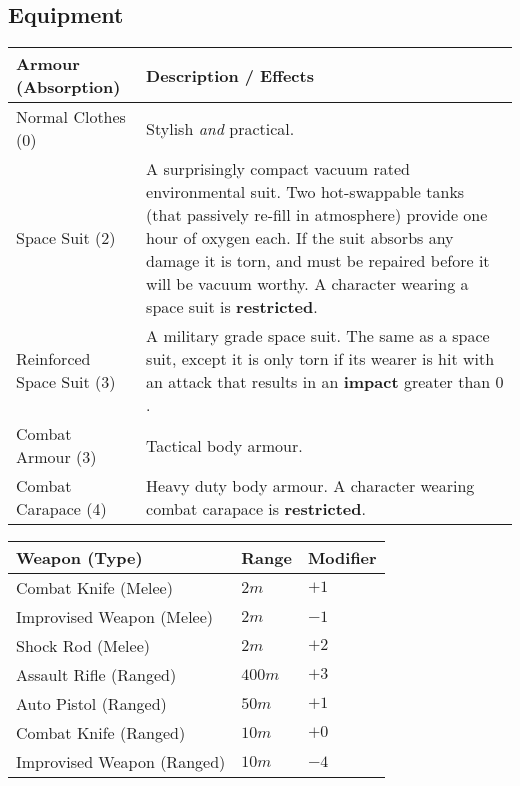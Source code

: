 \documentclass[11pt]{article}
\begin{document}
\begin{multicols}{3}
  \subsection*{Equipment}

  \begin{tabularx}{\linewidth}{lX}
    Armour (Absorption) & Description / Effects \\
    \hline
    Normal Clothes (0) & Stylish \textit{and} practical. \\
    Space Suit (2) & A surprisingly compact vacuum rated environmental suit. Two hot-swappable tanks (that passively re-fill in atmosphere) provide one hour of oxygen each. If the suit absorbs any damage it is torn, and must be repaired before it will be vacuum worthy. A character wearing a space suit is \textbf{restricted}. \\
    Reinforced Space Suit (3) & A military grade space suit. The same as a space suit, except it is only torn if its wearer is hit with an attack that results in an \textbf{impact} greater than $0$. \\
    Combat Armour (3) & Tactical body armour. \\
    Combat Carapace (4) & Heavy duty body armour. A character wearing combat carapace is \textbf{restricted}.
  \end{tabularx}

  \begin{tabularx}{\linewidth}{lXX}
    Weapon (Type) & Range & Modifier \\
    \hline
    Combat Knife (Melee) & $2m$ & $+1$ \\
    Improvised Weapon (Melee) & $2m$ & $-1$ \\
    Shock Rod (Melee) & $2m$ & $+2$ \\
    Assault Rifle (Ranged) & $400m$ & $+3$ \\
    Auto Pistol (Ranged) & $50m$ & $+1$ \\
    Combat Knife (Ranged) & $10m$ & $+0$ \\
    Improvised Weapon (Ranged) & $10m$ & $-4$
  \end{tabularx}


\end{multicols}
\end{document}
